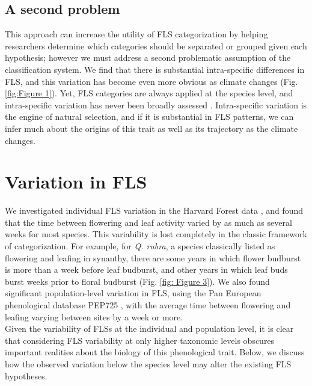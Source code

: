 \documentclass[12pt]{article}\usepackage[]{graphicx}\usepackage[]{color}
\begin{document}
\subsection*{A second problem}
\indent This approach can increase the utility of FLS categorization by helping researchers determine which categories should be separated or grouped given each hypothesis; however we must address a second problematic assumption of the classification system. 
We find that there is substantial intra-specific differences in FLS, and this variation has become even more obvious as climate changes (Fig. \ref{fig:Figure 1}). Yet, FLS categories are always applied at the species level, and intra-specific variation has never been broadly assessed \citep{Gougherty2018}. Intra-specific variation is the engine of natural selection, and if it is substantial in FLS patterns, we can infer much about the origins of this trait as well as its trajectory as the climate changes.

\section*{Variation in FLS}
 \indent\indent We investigated individual FLS variation in the Harvard Forest data \citep{OKeefe2015}, and found that the time between flowering and leaf activity varied by as much as several weeks for most species. This variability is lost completely in the classic framework of categorization. For example, for  \textit{Q. rubra}, a species classically listed as flowering and leafing in synanthy, there are some years in which flower budburst is more than a week before leaf budburst, and other years in which leaf buds burst weeks prior to floral budburst (Fig. \ref{fig: Figure 3}). We also found significant population-level variation in FLS, using the Pan European phenological database PEP725 \citep{PEP725}, with the average time between flowering and leafing varying between sites by a week or more.\\
\indent Given the variability of FLSs at the individual and population level, it is clear that considering FLS variability at only higher taxonomic levels obscures important realities about the biology of this phenological trait. Below, we discuss how the observed variation below the species level may alter the existing FLS hypotheses.
\end{document}

